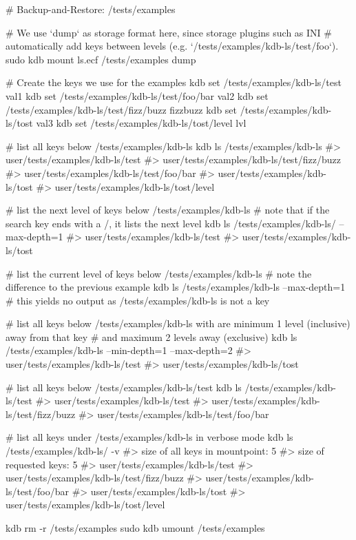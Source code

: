 \begin{DoxyCode}
# Backup-and-Restore: /tests/examples

# We use `dump` as storage format here, since storage plugins such as INI
# automatically add keys between levels (e.g. `/tests/examples/kdb-ls/test/foo`).
sudo kdb mount ls.ecf /tests/examples dump

# Create the keys we use for the examples
kdb set /tests/examples/kdb-ls/test val1
kdb set /tests/examples/kdb-ls/test/foo/bar val2
kdb set /tests/examples/kdb-ls/test/fizz/buzz fizzbuzz
kdb set /tests/examples/kdb-ls/tost val3
kdb set /tests/examples/kdb-ls/tost/level lvl

# list all keys below /tests/examples/kdb-ls
kdb ls /tests/examples/kdb-ls
#> user/tests/examples/kdb-ls/test
#> user/tests/examples/kdb-ls/test/fizz/buzz
#> user/tests/examples/kdb-ls/test/foo/bar
#> user/tests/examples/kdb-ls/tost
#> user/tests/examples/kdb-ls/tost/level

# list the next level of keys below /tests/examples/kdb-ls
# note that if the search key ends with a /, it lists the next level
kdb ls /tests/examples/kdb-ls/ --max-depth=1
#> user/tests/examples/kdb-ls/test
#> user/tests/examples/kdb-ls/tost

# list the current level of keys below /tests/examples/kdb-ls
# note the difference to the previous example
kdb ls /tests/examples/kdb-ls --max-depth=1
# this yields no output as /tests/examples/kdb-ls is not a key

# list all keys below /tests/examples/kdb-ls with are minimum 1 level (inclusive) away from that key
# and maximum 2 levels away (exclusive)
kdb ls /tests/examples/kdb-ls --min-depth=1 --max-depth=2
#> user/tests/examples/kdb-ls/test
#> user/tests/examples/kdb-ls/tost

# list all keys below /tests/examples/kdb-ls/test
kdb ls /tests/examples/kdb-ls/test
#> user/tests/examples/kdb-ls/test
#> user/tests/examples/kdb-ls/test/fizz/buzz
#> user/tests/examples/kdb-ls/test/foo/bar

# list all keys under /tests/examples/kdb-ls in verbose mode
kdb ls /tests/examples/kdb-ls/ -v
#> size of all keys in mountpoint: 5
#> size of requested keys: 5
#> user/tests/examples/kdb-ls/test
#> user/tests/examples/kdb-ls/test/fizz/buzz
#> user/tests/examples/kdb-ls/test/foo/bar
#> user/tests/examples/kdb-ls/tost
#> user/tests/examples/kdb-ls/tost/level

kdb rm -r /tests/examples
sudo kdb umount /tests/examples
\end{DoxyCode}


